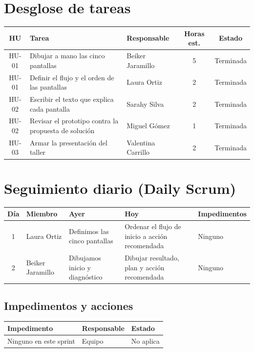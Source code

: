\documentclass[11pt,a4paper]{article}
\begin{document}
\section{Desglose de tareas}

\begin{tabularx}{\textwidth}{c X l c c}
  \toprule
  \textbf{HU} & \textbf{Tarea} & \textbf{Responsable} & \textbf{Horas est.} & \textbf{Estado} \\
  \midrule
  HU-01 & Dibujar a mano las cinco pantallas & Beiker Jaramillo & 5 & Terminada \\
  HU-01 & Definir el flujo y el orden de las pantallas & Laura Ortiz & 2 & Terminada \\
  HU-02 & Escribir el texto que explica cada pantalla & Sarahy Silva & 2 & Terminada \\
  HU-02 & Revisar el prototipo contra la propuesta de solución & Miguel Gómez & 1 & Terminada \\
  HU-03 & Armar la presentación del taller & Valentina Carrillo & 2 & Terminada \\
  \bottomrule
\end{tabularx}

\section{Seguimiento diario (Daily Scrum)}

\begin{tabularx}{\textwidth}{c l X X X}
  \toprule
  \textbf{Día} & \textbf{Miembro} & \textbf{Ayer} & \textbf{Hoy} & \textbf{Impedimentos} \\
  \midrule
  1 & Laura Ortiz & Definimos las cinco pantallas & Ordenar el flujo de inicio a acción recomendada & Ninguno \\
  2 & Beiker Jaramillo & Dibujamos inicio y diagnóstico & Dibujar resultado, plan y acción recomendada & Ninguno \\
  \bottomrule
\end{tabularx}

\subsection{Impedimentos y acciones}

\begin{tabularx}{\textwidth}{X l l}
  \toprule
  \textbf{Impedimento} & \textbf{Responsable} & \textbf{Estado} \\
  \midrule
  Ninguno en este sprint & Equipo & No aplica \\
  \bottomrule
\end{tabularx}
\end{document}
